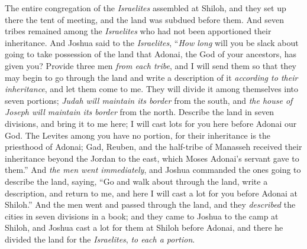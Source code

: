 \begin{biblechapter} %
 The entire congregation of the \textit{Israelites} assembled at Shiloh, and they set up there the tent of meeting, and the land was subdued before them.
\verse And seven tribes remained among the \textit{Israelites} who had not been apportioned their inheritance.
\verse And Joshua said to the \textit{Israelites}, “\textit{How long} will you be slack about going to take possession of the land that Adonai, the God of your ancestors, has given you?
\verse Provide three men \textit{from each tribe}, and I will send them so that they may begin to go through the land and write a description of it \textit{according to their inheritance}, and let them come to me.
\verse They will divide it among themselves into seven portions; \textit{Judah will maintain its border} from the south, and \textit{the house of Joseph will maintain its border} from the north.
\verse Describe the land in seven divisions, and bring it to me here; I will cast lots for you here before Adonai our God.
\verse The Levites among you have no portion, for their inheritance is the priesthood of Adonai; Gad, Reuben, and the half-tribe of Manasseh received their inheritance beyond the Jordan to the east, which Moses Adonai’s servant gave to them.”
\verse And \textit{the men went immediately}, and Joshua commanded the ones going to describe the land, saying, “Go and walk about through the land, write a description, and return to me, and here I will cast a lot for you before Adonai at Shiloh.”
\verse And the men went and passed through the land, and they \textit{described} the cities in seven divisions in a book; and they came to Joshua to the camp at Shiloh,
\verse and Joshua cast a lot for them at Shiloh before Adonai, and there he divided the land for the \textit{Israelites}, \textit{to each a portion}.

\end{biblechapter}
